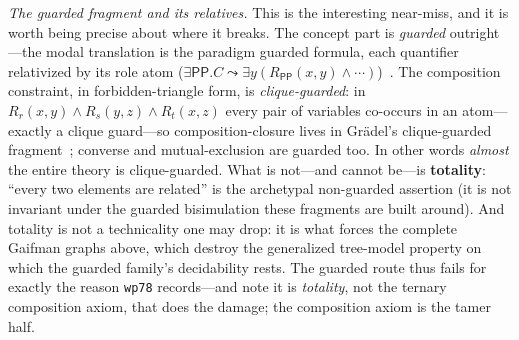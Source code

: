 \documentclass[11pt]{article}
\newcommand{\PP}{\mathsf{PP}}
\theoremstyle{plain}
\theoremstyle{definition}
\begin{document}
\emph{The guarded fragment and its relatives.} This is the interesting
near-miss, and it is worth being precise about where it breaks. The concept
part is \emph{guarded} outright---the modal translation is the paradigm
guarded formula, each quantifier relativized by its role atom
($\exists\PP.C\leadsto\exists y(R_\PP(x,y)\wedge\cdots)$)~\cite{AndrekaVanBenthemNemeti1998}.
The composition constraint, in forbidden-triangle form, is
\emph{clique-guarded}: in $R_r(x,y)\wedge R_s(y,z)\wedge R_t(x,z)$ every pair
of variables co-occurs in an atom---exactly a clique guard---so
composition-closure lives in Gr\"adel's clique-guarded fragment~\cite{Gradel1999};
converse and mutual-exclusion are guarded too. In other words \emph{almost}
the entire theory is clique-guarded. What is not---and cannot be---is
\textbf{totality}: ``every two elements are related'' is the archetypal
non-guarded assertion (it is not invariant under the guarded bisimulation
these fragments are built around). And totality is not a technicality one may
drop: it is what forces the complete Gaifman graphs above, which destroy the
generalized tree-model property on which the guarded family's decidability
rests. The guarded route thus fails for exactly the reason \texttt{wp78}
records---and note it is \emph{totality}, not the ternary composition axiom,
that does the damage; the composition axiom is the tamer half.
\end{document}
